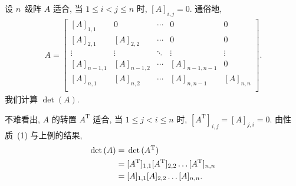 \documentclass[../libro.tex]{subfiles}
\begin{document}
\begin{example}
    设 \(n\)~级阵 \(A\) 适合,
    当 \(1 \leq i < j \leq n\) 时,
    \([A]_{i,j} = 0\).
    通俗地,
    \begin{align*}
        A =
        \begin{bmatrix}
            [A]_{1,1}   & 0           & \cdots & 0             & 0         \\
            [A]_{2,1}   & [A]_{2,2}   & \cdots & 0             & 0         \\
            \vdots      & \vdots      & \ddots & \vdots        & \vdots    \\
            [A]_{n-1,1} & [A]_{n-1,2} & \cdots & [A]_{n-1,n-1} & 0         \\
            [A]_{n,1}   & [A]_{n,2}   & \cdots & [A]_{n,n-1}   & [A]_{n,n} \\
        \end{bmatrix}.
    \end{align*}
    我们计算 \(\det {(A)}\).

    不难看出, \(A\) 的转置 \(A^{\mathrm{T}}\) 适合,
    当 \(1 \leq j < i \leq n\) 时,
    \([A^{\mathrm{T}}]_{i,j} = [A]_{j,i} = 0\).
    由性质~(1) 与上例的结果,
    \begin{align*}
        \det {(A)}
        = {} &
        \det {(A^{\mathrm{T}})}
        \\
        = {} &
        [A^{\mathrm{T}}]_{1,1} [A^{\mathrm{T}}]_{2,2}
        \dots [A^{\mathrm{T}}]_{n,n}
        \\
        = {} &
        [A]_{1,1} [A]_{2,2} \dots [A]_{n,n}.
        \qedhere
    \end{align*}
\end{example}
\end{document}
